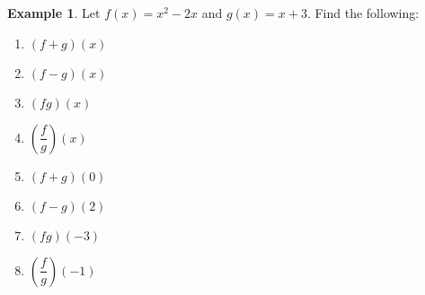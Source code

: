\documentclass[addpoints,12pt]{exam}
\theoremstyle{definition}
\newtheorem{example}{Example}[subsection]
\begin{document}
\newpage

\begin{example}
Let $f(x) = x^2-2x$ and $g(x) = x+3$. Find the following:
\vspace{.2in}

\begin{minipage}{.5\textwidth}
\begin{enumerate}
\item $(f+g)(x)$
\vspace{1.25in}
\item $(f-g)(x)$
\vspace{1.25in}
\item $(fg)(x)$
\vspace{1.25in}
\item $\left(\dfrac{f}{g}\right)(x)$
\vspace{1.25in}
\end{enumerate}
\end{minipage}%
\begin{minipage}{.5\textwidth}
\begin{enumerate}
\setcounter{enumi}{4}
\item $(f+g)(0)$
\vspace{1.25in}
\item $(f-g)(2)$
\vspace{1.25in}
\item $(fg)(-3)$
\vspace{1.25in}
\item $\left(\dfrac{f}{g}\right)(-1)$
\vspace{1.25in}
\end{enumerate}
\end{minipage}%
\end{example}
\end{document}
